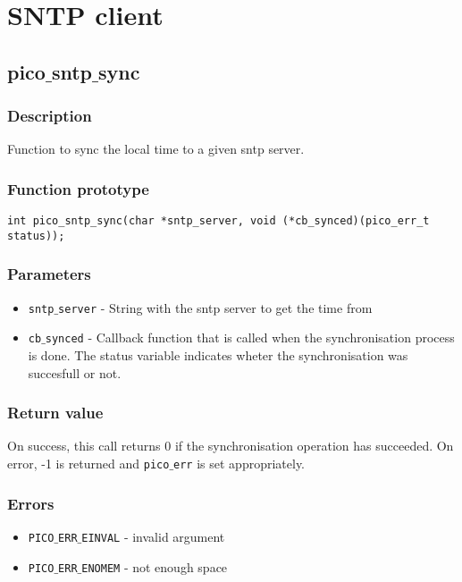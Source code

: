 \section{SNTP client}



\subsection{pico$\_$sntp$\_$sync}

\subsubsection*{Description}
Function to sync the local time to a given sntp server.
\subsubsection*{Function prototype}
\begin{verbatim}
int pico_sntp_sync(char *sntp_server, void (*cb_synced)(pico_err_t status));
\end{verbatim}

\subsubsection*{Parameters}
\begin{itemize}[noitemsep]
\item \texttt{sntp$\_$server} - String with the sntp server to get the time from
\item \texttt{cb$\_$synced} - Callback function that is called when the synchronisation process is done. The status variable indicates wheter the synchronisation was succesfull or not.
\end{itemize}

\subsubsection*{Return value}
On success, this call returns 0 if the synchronisation operation has succeeded.
On error, -1 is returned and \texttt{pico$\_$err} is set appropriately.

\subsubsection*{Errors}
\begin{itemize}[noitemsep]
\item \texttt{PICO$\_$ERR$\_$EINVAL} - invalid argument
\item \texttt{PICO$\_$ERR$\_$ENOMEM} - not enough space
\end{itemize}

